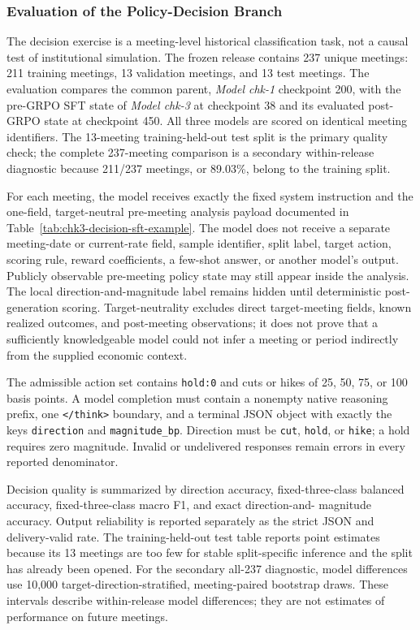


\subsubsection*{Evaluation of the Policy-Decision Branch}

The decision exercise is a meeting-level historical classification task, not
a causal test of institutional simulation. The frozen release contains 237
unique meetings: 211 training meetings, 13 validation meetings, and 13 test
meetings. The evaluation compares the common parent, \textit{Model chk-1}
checkpoint 200, with the pre-GRPO SFT state of \textit{Model chk-3} at
checkpoint 38 and its evaluated post-GRPO state at checkpoint 450. All three
models are scored on identical meeting identifiers. The 13-meeting
training-held-out test split is the primary quality check; the complete
237-meeting comparison is a secondary within-release diagnostic because
211/237 meetings, or 89.03\%, belong to the training split.

For each meeting, the model receives exactly the fixed system instruction and
the one-field, target-neutral pre-meeting analysis payload documented in
Table~\ref{tab:chk3-decision-sft-example}. The model does not receive a
separate meeting-date or current-rate field, sample identifier, split label,
target action, scoring rule, reward coefficients, a few-shot answer, or another
model's output. Publicly observable pre-meeting policy state may still appear
inside the analysis. The local direction-and-magnitude label remains hidden until
deterministic post-generation scoring. Target-neutrality excludes direct
target-meeting fields, known realized outcomes, and post-meeting observations;
it does not prove that a sufficiently knowledgeable model could not infer a
meeting or period indirectly from the supplied economic context.

The admissible action set contains \texttt{hold:0} and cuts or hikes of 25,
50, 75, or 100 basis points. A model completion must contain a nonempty native
reasoning prefix, one \texttt{</think>} boundary, and a terminal JSON object
with exactly the keys \texttt{direction} and \texttt{magnitude\_bp}. Direction
must be \texttt{cut}, \texttt{hold}, or \texttt{hike}; a hold requires zero
magnitude. Invalid or undelivered responses remain errors in every reported
denominator.

Decision quality is summarized by direction accuracy, fixed-three-class
balanced accuracy, fixed-three-class macro F1, and exact direction-and-
magnitude accuracy. Output reliability is reported separately as the strict
JSON and delivery-valid rate. The training-held-out test table reports point
estimates because its 13 meetings are too few for stable split-specific
inference and the split has already been opened. For the secondary all-237
diagnostic, model differences use 10,000 target-direction-stratified,
meeting-paired bootstrap draws. These intervals describe within-release model
differences; they are not estimates of performance on future meetings.








